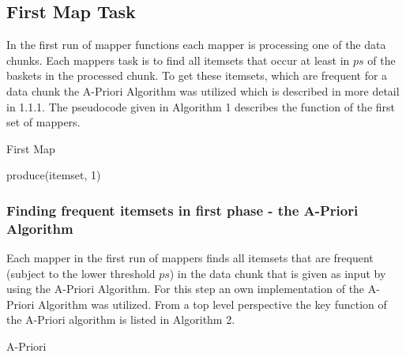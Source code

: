 \subsection{First Map Task}\label{first map task}
In the first run of mapper functions each mapper is processing one of the data chunks. Each mappers task is to find all itemsets that occur at least in $ps$ of the baskets in the processed chunk. To get these itemsets, which are frequent for a data chunk the A-Priori Algorithm was utilized which is described in more detail in 1.1.1.
The pseudocode given in Algorithm 1 describes the function of the first set of mappers.
\begin{algorithm}
  \caption{First Map}\label{First Map}
  \begin{algorithmic}[1]
     
            \State produce(itemset, 1)
       \EndFor

    \EndFunction
\end{algorithmic}
\end{algorithm}
\subsubsection{Finding frequent itemsets in first phase - the A-Priori Algorithm}\label{A-Priori}
Each mapper in the first run of mappers finds all itemsets that are frequent (subject to the lower threshold $ps$) in the data chunk that is given as input by using the A-Priori Algorithm. For this step an own implementation of the A-Priori Algorithm was utilized. From a top level perspective the key function of the A-Priori algorithm is listed in Algorithm 2.
\begin{algorithm}
  \caption{A-Priori}\label{Apriori}
  \begin{algorithmic}[1]
      \EndIf
      \EndIf
      \EndWhile
      \State {}
    \EndFunction
\end{algorithmic}
\end{algorithm}
